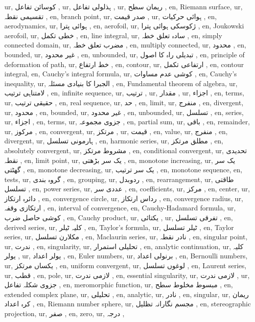 ur, کوسائن تفاعل ,
ur, ہذلولی تفاعل ,
ur, ریمان سطح ,
en, Riemann surface,
ur, تقسیمی نقطہ ,
en, branch point,
ur, صدر قیمت ,
ur, ہوائی حرکیات ,
en, aerodynamics,
ur, ہوائی پترا ,
en, aerofoil,
ur, ژکوسکی ہوائی پترا ,
en, Joukowski aerofoil,
ur, خطی تکمل ,
en, line integral,
ur, سادہ تعلق خطہ ,
en, simply connected domain,
ur, مضرب تعلق خطہ ,
en, multiply connected,
ur, محدود ,
en, bounded,
ur, غیر محدود ,
en, unbounded,
ur, تبدیلی راہ کا اصول ,
en, principle of deformation of path,
ur, خط ارتفاع ,
en, contour,
ur, ارتفاعی تکمل ,
en, contour integral,
en, Cauchy's integral formula,
ur, کوشی عدم مساوات ,
en, Cauchy's inequality,
ur, الجبرا کا بنیادی مسئلہ ,
en, Fundamental theorem of algebra,
ur, لامتناہی ترتیب ,
en, infinite sequence,
ur, ترتیب ,
ur, مقدار ,
ur, اجزاء ,
en, terms,
ur, حقیقی ترتیب ,
en, real sequence,
ur, حد ,
en, limit,
ur, منفرج ,
en, divergent,
ur, محدود ,
en, bounded,
ur, غیر محدود ,
en, unbounded,
ur, تسلسل ,
en, series,
ur, اجزاء ,
en, terms,
ur, جزوی مجموعہ ,
en, partial sum,
ur, باقی ,
en, remainder,
ur, مرکوز ,
en, convergent,
ur, مرتکز ,
ur, قیمت ,
en, value,
ur, منفرج ,
en, divergent,
ur, ہارمونی تسلسل ,
en, harmonic series,
ur, مطلق مرتکز ,
en, absolutely convergent,
ur, مشروط مرتکز ,
en, conditional convergent,
ur, تحدیدی نقطہ ,
en, limit point,
ur, یک سر بڑھتی ,
en, monotone increasing,
ur, یک سر گھٹتی ,
en, monotone decreasing,
ur, یک سر ترتیب ,
en, monotone sequence,
en, tests,
ur, گروہ بندی ,
en, grouping,
ur, ردوبدل ,
en, rearrangement,
ur, طاقتی تسلسل ,
en, power series,
ur, عددی سر ,
en, coefficients,
ur, مرکز ,
en, center,
ur, دائرہ ارتکاز ,
en, convergence circle,
ur, رداس ارتکاز ,
en, convergence radius,
ur, ارتکازی وقفہ ,
en, interval of convergence,
en, Cauchy-Hadamard formula,
ur, کوشی حاصل ضرب ,
en, Cauchy product,
ur, یکتائی ,
ur, تفرقی تسلسل ,
en, derived series,
ur, کلیہ ٹیلر ,
en, Taylor's formula,
ur, ٹیلر تسلسل ,
en, Taylor series,
ur, مکلارن تسلسل ,
en, Maclaurin series,
ur, نادر نقطہ ,
en, singular point,
ur, ندرت ,
en, singularity,
ur, تحلیلی استمرار ,
en, analytic continuation,
ur, کلیہ یولر ,
ur, یولر اعداد ,
en, Euler numbers,
ur, برنولی اعداد ,
en, Bernoulli numbers,
ur, یکساں مرتکز ,
en, uniform convergent,
ur, لوغوں تسلسل ,
en, Laurent series,
ur, قطب ,
en, pole,
ur, لازمی ندرت ,
en, essential singularity,
ur, لازمی ندرت ,
ur, جزوی شکلہ تفاعل ,
en, meromorphic function,
ur, مبسوط مخلوط سطح ,
en, extended complex plane,
ur, تحلیلی ,
en, analytic,
ur, نادر ,
en, singular,
ur, ریمان کرہ اعداد ,
en, Riemann number sphere,
ur, مجسم نگارانہ تظلیل ,
en, stereographic projection,
ur, صفر ,
en, zero,
ur, درجہ ,
